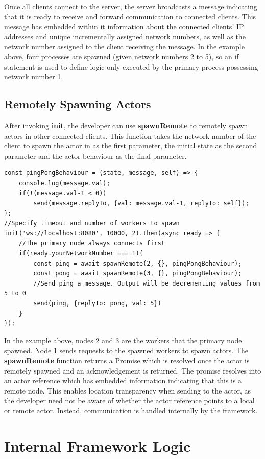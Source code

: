 \documentclass[12pt, a4paper]{report}
\theoremstyle{definition}
\theoremstyle{definition}%
\theoremstyle{definition}%
\theoremstyle{definition}%
\theoremstyle{definition}%
\theoremstyle{definition}%
\begin{document}
Once all clients connect to the server, the server broadcasts a message indicating that it is ready to receive and forward communication to connected clients. This message has embedded within it information about the connected clients' IP addresses and unique incrementally assigned network numbers, as well as the network number assigned to the client receiving the message. In the example above, four processes are spawned (given network numbers 2 to 5), so an if statement is used to define logic only executed by the primary process possessing network number 1.

\subsection{Remotely Spawning Actors}
After invoking \textbf{init}, the developer can use \textbf{spawnRemote} to remotely spawn actors in other connected clients. This function takes the network number of the client to spawn the actor in as the first parameter, the initial state as the second parameter and the actor behaviour as the final parameter.
\begin{lstlisting}
const pingPongBehaviour = (state, message, self) => {
    console.log(message.val);
    if(!(message.val-1 < 0))
        send(message.replyTo, {val: message.val-1, replyTo: self});
};
//Specify timeout and number of workers to spawn
init('ws://localhost:8080', 10000, 2).then(async ready => {
    //The primary node always connects first
    if(ready.yourNetworkNumber === 1){
        const ping = await spawnRemote(2, {}, pingPongBehaviour);
        const pong = await spawnRemote(3, {}, pingPongBehaviour);
        //Send ping a message. Output will be decrementing values from 5 to 0
        send(ping, {replyTo: pong, val: 5})
    }
});
\end{lstlisting}
In the example above, nodes 2 and 3 are the workers that the primary node spawned. Node 1 sends requests to the spawned workers to spawn actors. The \textbf{spawnRemote} function returns a Promise which is resolved once the actor is remotely spawned and an acknowledgement is returned. The promise resolves into an actor reference which has embedded information indicating that this is a remote node. This enables location transparency when sending to the actor, as the developer need not be aware of whether the actor reference points to a local or remote actor. Instead, communication is handled internally by the framework.
\section{Internal Framework Logic}
\end{document}
